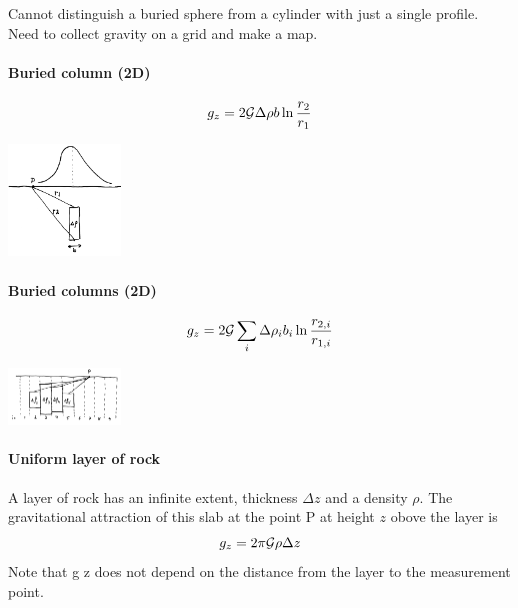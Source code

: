 Cannot distinguish a buried sphere from a cylinder with just a single profile. Need to
collect gravity on a grid and make a map.

\paragraph{Buried column (2D)}

\[
g_z=2 {\cal G} \Delta \rho b \ln \frac{r_2}{r_1}
\]

\begin{center}
\includegraphics[width=3cm]{images/gravity/column}
\end{center}

\paragraph{Buried columns (2D)}

\[
g_z=2 {\cal G} \sum_i  \Delta \rho_i  b_i  \ln \frac{r_{2,i}}{r_{1,i}}
\]

\begin{center}
\includegraphics[width=3cm]{images/gravity/columns}
\end{center}





\paragraph{Uniform layer of rock}

A layer of rock has an infinite extent, thickness $\Delta z$ 
and a density $\rho$. The gravitational
attraction of this slab at the point P at height $z$ obove the layer is 
\[
g_z=2 \pi {\cal G} \rho \Delta z
\]
Note that g z does not depend on the distance from the layer to the measurement point.




